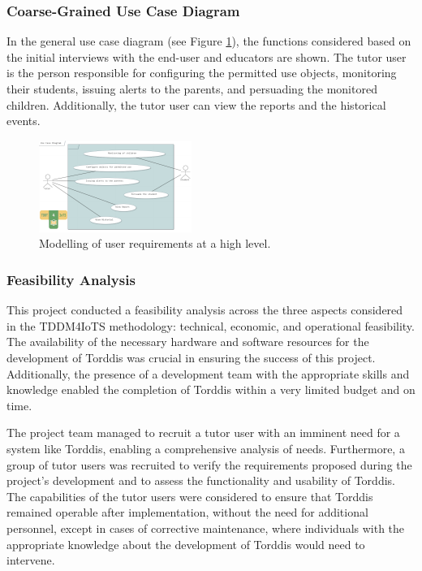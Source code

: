 \documentclass[a4paper,fleqn]{cas-sc}
\begin{document}
			\subsubsection{Coarse-Grained Use Case Diagram}
				In the general use case diagram (see Figure \ref{fig:UseCaseDiagram}), the functions considered based on the initial interviews with the end-user and educators are shown. The tutor user is the person responsible for configuring the permitted use objects, monitoring their students, issuing alerts to the parents, and persuading the monitored children. Additionally, the tutor user can view the reports and the historical events.
				
				\begin{figure}[hbt!]
					\centering
					\includegraphics[frame,scale=0.5, width=\linewidth]{figs/Figure_4}
					\caption{Modelling of user requirements at a high level.\label{fig:UseCaseDiagram}}
				\end{figure} 
				
			\subsubsection{Feasibility Analysis}
				This project conducted a feasibility analysis across the three aspects considered in the TDDM4IoTS methodology: technical, economic, and operational feasibility. The availability of the necessary hardware and software resources for the development of Torddis was crucial in ensuring the success of this project. Additionally, the presence of a development team with the appropriate skills and knowledge enabled the completion of Torddis within a very limited budget and on time.
				
				The project team managed to recruit a tutor user with an imminent need for a system like Torddis, enabling a comprehensive analysis of needs. Furthermore, a group of tutor users was recruited to verify the requirements proposed during the project’s development and to assess the functionality and usability of Torddis. The capabilities of the tutor users were considered to ensure that Torddis remained operable after implementation, without the need for additional personnel, except in cases of corrective maintenance, where individuals with the appropriate knowledge about the development of Torddis would need to intervene.
\end{document}
